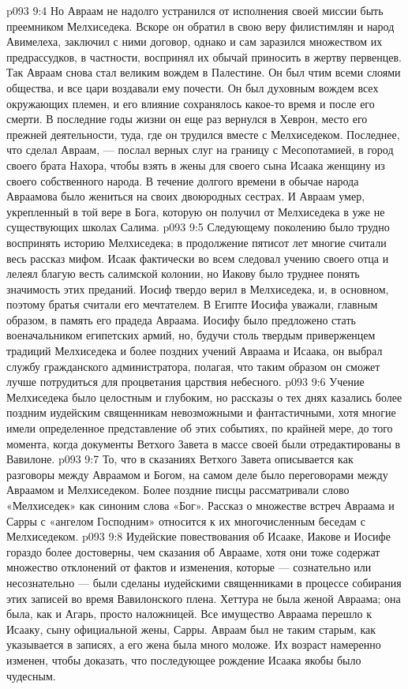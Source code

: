 \vs p093 9:4 Но Авраам не надолго устранился от исполнения своей миссии быть преемником Мелхиседека. Вскоре он обратил в свою веру филистимлян и народ Авимелеха, заключил с ними договор, однако и сам заразился множеством их предрассудков, в частности, воспринял их обычай приносить в жертву первенцев. Так Авраам снова стал великим вождем в Палестине. Он был чтим всеми слоями общества, и все цари воздавали ему почести. Он был духовным вождем всех окружающих племен, и его влияние сохранялось какое\hyp{}то время и после его смерти. В последние годы жизни он еще раз вернулся в Хеврон, место его прежней деятельности, туда, где он трудился вместе с Мелхиседеком. Последнее, что сделал Авраам, --- послал верных слуг на границу с Месопотамией, в город своего брата Нахора, чтобы взять в жены для своего сына Исаака женщину из своего собственного народа. В течение долгого времени в обычае народа Авраамова было жениться на своих двоюродных сестрах. И Авраам умер, укрепленный в той вере в Бога, которую он получил от Мелхиседека в уже не существующих школах Салима.
\vs p093 9:5 \pc Следующему поколению было трудно воспринять историю Мелхиседека; в продолжение пятисот лет многие считали весь рассказ мифом. Исаак фактически во всем следовал учению своего отца и лелеял благую весть салимской колонии, но Иакову было труднее понять значимость этих преданий. Иосиф твердо верил в Мелхиседека, и, в основном, поэтому братья считали его мечтателем. В Египте Иосифа уважали, главным образом, в память его прадеда Авраама. Иосифу было предложено стать военачальником египетских армий, но, будучи столь твердым приверженцем традиций Мелхиседека и более поздних учений Авраама и Исаака, он выбрал службу гражданского администратора, полагая, что таким образом он сможет лучше потрудиться для процветания царствия небесного.
\vs p093 9:6 Учение Мелхиседека было целостным и глубоким, но рассказы о тех днях казались более поздним иудейским священникам невозможными и фантастичными, хотя многие имели определенное представление об этих событиях, по крайней мере, до того момента, когда документы Ветхого Завета в массе своей были отредактированы в Вавилоне.
\vs p093 9:7 То, что в сказаниях Ветхого Завета описывается как разговоры между Авраамом и Богом, на самом деле было переговорами между Авраамом и Мелхиседеком. Более поздние писцы рассматривали слово «Мелхиседек» как синоним слова «Бог». Рассказ о множестве встреч Авраама и Сарры с «ангелом Господним» относится к их многочисленным беседам с Мелхиседеком.
\vs p093 9:8 Иудейские повествования об Исааке, Иакове и Иосифе гораздо более достоверны, чем сказания об Аврааме, хотя они тоже содержат множество отклонений от фактов и изменения, которые --- сознательно или несознательно --- были сделаны иудейскими священниками в процессе собирания этих записей во время Вавилонского плена. Хеттура не была женой Авраама; она была, как и Агарь, просто наложницей. Все имущество Авраама перешло к Исааку, сыну официальной жены, Сарры. Авраам был не таким старым, как указывается в записях, а его жена была много моложе. Их возраст намеренно изменен, чтобы доказать, что последующее рождение Исаака якобы было чудесным.
